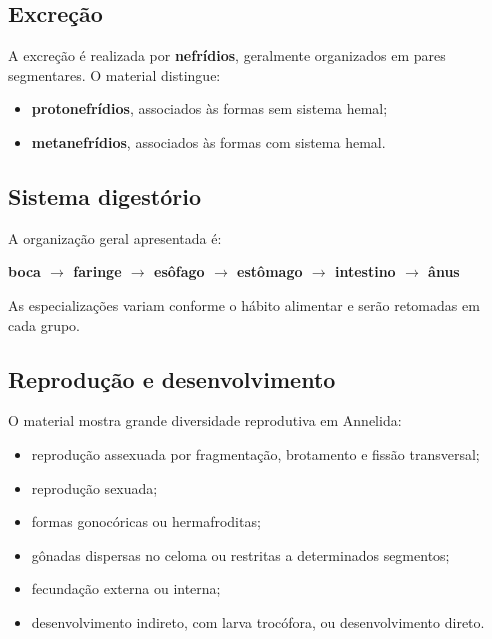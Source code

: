 \documentclass[a4paper,12pt]{article}
\newcommand{\termo}[1]{\textbf{#1}}
\begin{document}
\subsection{Excreção}

A excreção é realizada por \termo{nefrídios}, geralmente organizados em pares segmentares. O material distingue:

\begin{itemize}
  \item \termo{protonefrídios}, associados às formas sem sistema hemal;
  \item \termo{metanefrídios}, associados às formas com sistema hemal.
\end{itemize}

\subsection{Sistema digestório}

A organização geral apresentada é:

\begin{center}
\textbf{boca $\rightarrow$ faringe $\rightarrow$ esôfago $\rightarrow$ estômago $\rightarrow$ intestino $\rightarrow$ ânus}
\end{center}

As especializações variam conforme o hábito alimentar e serão retomadas em cada grupo.

\subsection{Reprodução e desenvolvimento}

O material mostra grande diversidade reprodutiva em Annelida:

\begin{itemize}
  \item reprodução assexuada por fragmentação, brotamento e fissão transversal;
  \item reprodução sexuada;
  \item formas gonocóricas ou hermafroditas;
  \item gônadas dispersas no celoma ou restritas a determinados segmentos;
  \item fecundação externa ou interna;
  \item desenvolvimento indireto, com larva trocófora, ou desenvolvimento direto.
\end{itemize}

\end{document}
